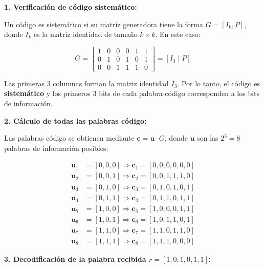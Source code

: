 \documentclass[10pt,a4paper]{article}
\begin{document}
\begin{solucion}
\textbf{1. Verificación de código sistemático:}

Un código es sistemático si su matriz generadora tiene la forma $G = [I_k, P]$, donde $I_k$ es la matriz identidad de tamaño $k \times k$. En este caso:

\[
G = \begin{bmatrix}
\boxed{1} & \boxed{0} & \boxed{0} & 0 & 1 & 1 \\
\boxed{0} & \boxed{1} & \boxed{0} & 1 & 0 & 1 \\
\boxed{0} & \boxed{0} & \boxed{1} & 1 & 1 & 0
\end{bmatrix} = \left[ I_3 \mid P \right]
\]

Las primeras 3 columnas forman la matriz identidad $I_3$. Por lo tanto, el código es \textbf{sistemático} y los primeros 3 bits de cada palabra código corresponden a los bits de información.

\textbf{2. Cálculo de todas las palabras código:}

Las palabras código se obtienen mediante $\mathbf{c} = \mathbf{u} \cdot G$, donde $\mathbf{u}$ son las $2^3 = 8$ palabras de información posibles:

\begin{align*}
\mathbf{u}_1 &= [0,0,0] \Rightarrow \mathbf{c}_1 = [0,0,0,0,0,0] \\
\mathbf{u}_2 &= [0,0,1] \Rightarrow \mathbf{c}_2 = [0,0,1,1,1,0] \\
\mathbf{u}_3 &= [0,1,0] \Rightarrow \mathbf{c}_3 = [0,1,0,1,0,1] \\
\mathbf{u}_4 &= [0,1,1] \Rightarrow \mathbf{c}_4 = [0,1,1,0,1,1] \\
\mathbf{u}_5 &= [1,0,0] \Rightarrow \mathbf{c}_5 = [1,0,0,0,1,1] \\
\mathbf{u}_6 &= [1,0,1] \Rightarrow \mathbf{c}_6 = [1,0,1,1,0,1] \\
\mathbf{u}_7 &= [1,1,0] \Rightarrow \mathbf{c}_7 = [1,1,0,1,1,0] \\
\mathbf{u}_8 &= [1,1,1] \Rightarrow \mathbf{c}_8 = [1,1,1,0,0,0]
\end{align*}

\textbf{3. Decodificación de la palabra recibida $r = [1,0,1,0,1,1]$:}


\end{solucion}
\end{document}
